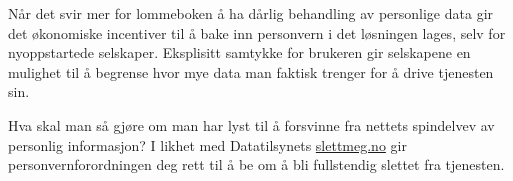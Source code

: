 \documentclass[12pt,a4paper, norsk]{article}
\begin{document}
Når det svir mer for lommeboken å ha dårlig behandling av personlige data gir det økonomiske
incentiver til å bake inn personvern i det løsningen lages, selv for nyoppstartede
selskaper. Eksplisitt samtykke for brukeren gir selskapene en mulighet til å
begrense hvor mye data man faktisk trenger for å drive tjenesten sin.

Hva skal man så gjøre om man har lyst til å forsvinne fra nettets spindelvev av personlig
informasjon? I likhet med Datatilsynets \url{slettmeg.no} gir personvernforordningen deg
rett til å be om å bli fullstendig slettet fra tjenesten.



\printbibliography[heading=bibintoc, title={Litteraturliste}]
\end{document}
